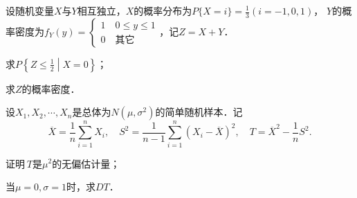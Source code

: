 \documentclass[plain,noanswer,medmath]{../../template/jnuexam}
\begin{document}
\begin{problem}[points=11]
设随机变量$X$与$Y$相互独立，$X$的概率分布为$P\{X = i\} = \frac{1}{3}\left(i = - 1,0,1 \right)$，
$Y$的概率密度为$f_Y(y) = \begin{cases}
  1\quad 0 \le y \le 1 \\
  0\quad \text{其它}
\end{cases}$，记$Z = X + Y$．\par
\begin{enumerate*}
\item 求$P\left\{ Z \le \frac{1}{2} \middle| X = 0 \right\}$；
\item 求$Z$的概率密度．
\end{enumerate*}
\end{problem}


\begin{problem}[points=11]
设$X_1,X_2, \cdots ,X_n$是总体为$N(\mu ,\sigma^2)$的简单随机样本．记
$$\overline{X} = \frac{1}{n}\sum_{i = 1}^n X_i ,
  \quad S^2 = \frac{1}{n - 1}\sum_{i = 1}^n (X_i - \overline{X})^2 ,
  \quad T = \overline{X}^2 - \frac{1}{n} S^2.$$
\begin{enumerate*}
\item 证明 $T$是$\mu^2$的无偏估计量；
\item 当$\mu = 0,\sigma = 1$时，求$DT$．
\end{enumerate*}
\end{problem}
\end{document}

